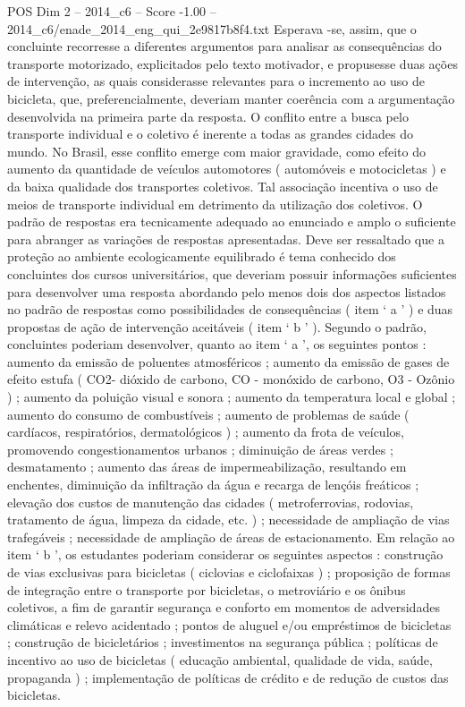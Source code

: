 \begin{textsample}{POS Dim 2 – 2014\_c6 – Score -1.00 – 2014\_c6/enade\_2014\_eng\_qui\_2e9817b8f4.txt}
Esperava -se, assim, que o concluinte recorresse a diferentes argumentos para analisar as consequências do transporte motorizado, explicitados pelo texto motivador, e propusesse duas ações de intervenção, as quais considerasse relevantes para o incremento ao uso de bicicleta, que, preferencialmente, deveriam manter coerência com a argumentação desenvolvida na primeira parte da resposta.
O conflito entre a busca pelo transporte individual e o coletivo é inerente a todas as grandes cidades do mundo.
No Brasil, esse conflito emerge com maior gravidade, como efeito do aumento da quantidade de veículos automotores ( automóveis e motocicletas ) e da baixa qualidade dos transportes coletivos.
Tal associação incentiva o uso de meios de transporte individual em detrimento da utilização dos coletivos.
O padrão de respostas era tecnicamente adequado ao enunciado e amplo o suficiente para abranger as variações de respostas apresentadas.
Deve ser ressaltado que a proteção ao ambiente ecologicamente equilibrado é tema conhecido dos concluintes dos cursos universitários, que deveriam possuir informações suficientes para desenvolver uma resposta abordando pelo menos dois dos aspectos listados no padrão de respostas como possibilidades de consequências ( item ‘ a ’ ) e duas propostas de ação de intervenção aceitáveis ( item ‘ b ’ ).
Segundo o padrão, concluintes poderiam desenvolver, quanto ao item ‘ a ’, os seguintes pontos : aumento da emissão de poluentes atmosféricos ; aumento da emissão de gases de efeito estufa ( CO2- dióxido de carbono, CO - monóxido de carbono, O3 - Ozônio ) ; aumento da poluição visual e sonora ; aumento da temperatura local e global ; aumento do consumo de combustíveis ; aumento de problemas de saúde ( cardíacos, respiratórios, dermatológicos ) ; aumento da frota de veículos, promovendo congestionamentos urbanos ; diminuição de áreas verdes ; desmatamento ; aumento das áreas de impermeabilização, resultando em enchentes, diminuição da infiltração da água e recarga de lençóis freáticos ; elevação dos custos de manutenção das cidades ( metroferrovias, rodovias, tratamento de água, limpeza da cidade, etc. ) ; necessidade de ampliação de vias trafegáveis ; necessidade de ampliação de áreas de estacionamento.
Em relação ao item ‘ b ’, os estudantes poderiam considerar os seguintes aspectos : construção de vias exclusivas para bicicletas ( ciclovias e ciclofaixas ) ; proposição de formas de integração entre o transporte por bicicletas, o metroviário e os ônibus coletivos, a fim de garantir segurança e conforto em momentos de adversidades climáticas e relevo acidentado ; pontos de aluguel e/ou empréstimos de bicicletas ; construção de bicicletários ; investimentos na segurança pública ; políticas de incentivo ao uso de bicicletas ( educação ambiental, qualidade de vida, saúde, propaganda ) ; implementação de políticas de crédito e de redução de custos das bicicletas.

\end{textsample}
